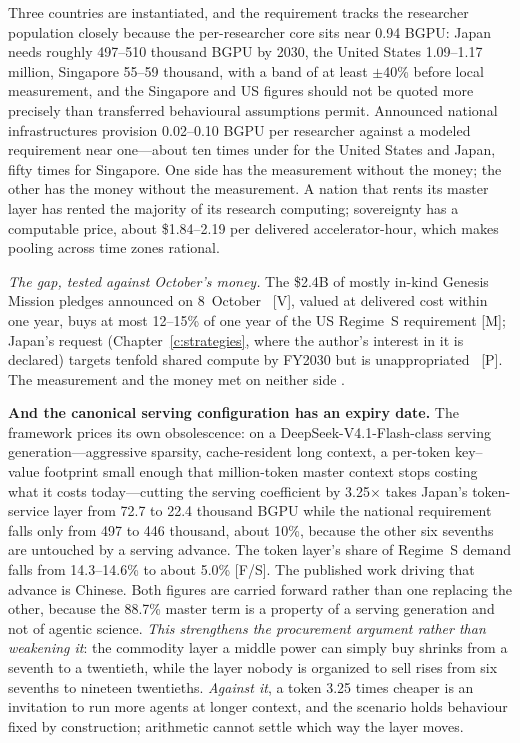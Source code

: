 Three countries are instantiated, and the requirement tracks the researcher population closely because the per-researcher core sits near 0.94 BGPU: Japan needs roughly 497--510 thousand BGPU by 2030, the United States 1.09--1.17 million, Singapore 55--59 thousand, with a band of at least $\pm$40\% before local measurement, and the Singapore and US figures should not be quoted more precisely than transferred behavioural assumptions permit. Announced national infrastructures provision 0.02--0.10 BGPU per researcher against a modeled requirement near one---about ten times under for the United States and Japan, fifty times for Singapore. One side has the measurement without the money; the other has the money without the measurement. A nation that rents its master layer has rented the majority of its research computing; sovereignty has a computable price, about \$1.84--2.19 per delivered accelerator-hour, which makes pooling across time zones rational.

\emph{The gap, tested against October's money.} The \$2.4B of mostly in-kind Genesis Mission pledges announced on 8~October~\cite{sci-wh-summit} [V], valued at delivered cost within one year, buys at most 12--15\% of one year of the US Regime~S requirement [M]; Japan's request (Chapter~\ref{c:strategies}, where the author's interest in it is declared) targets tenfold shared compute by FY2030 but is unappropriated~\cite{gov-mext-fy2027} [P]. The measurement and the money met on neither side .

\textbf{And the canonical serving configuration has an expiry date.} The framework prices its own obsolescence: on a DeepSeek-V4.1-Flash-class serving generation---aggressive sparsity, cache-resident long context, a per-token key--value footprint small enough that million-token master context stops costing what it costs today---cutting the serving coefficient by 3.25$\times$ takes Japan's token-service layer from 72.7 to 22.4 thousand BGPU while the national requirement falls only from 497 to 446 thousand, about 10\%, because the other six sevenths are untouched by a serving advance. The token layer's share of Regime~S demand falls from 14.3--14.6\% to about 5.0\% [F/S]. The published work driving that advance is Chinese. Both figures are carried forward rather than one replacing the other, because the 88.7\% master term is a property of a serving generation and not of agentic science. \emph{This strengthens the procurement argument rather than weakening it}: the commodity layer a middle power can simply buy shrinks from a seventh to a twentieth, while the layer nobody is organized to sell rises from six sevenths to nineteen twentieths. \emph{Against it}, a token 3.25 times cheaper is an invitation to run more agents at longer context, and the scenario holds behaviour fixed by construction; arithmetic cannot settle which way the layer moves.


